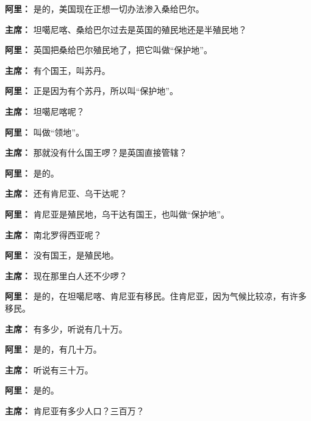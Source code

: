 \begin{duihua}
\item[\textbf{阿里：}] 是的，美国现在正想一切办法渗入桑给巴尔。

\item[\textbf{主席：}] 坦噶尼喀、桑给巴尔过去是英国的殖民地还是半殖民地？

\item[\textbf{阿里：}] 英国把桑给巴尔殖民地了，把它叫做“保护地”。

\item[\textbf{主席：}] 有个国王，叫苏丹。

\item[\textbf{阿里：}] 正是因为有个苏丹，所以叫“保护地”。

\item[\textbf{主席：}] 坦噶尼喀呢？

\item[\textbf{阿里：}] 叫做“领地”。

\item[\textbf{主席：}] 那就没有什么国王啰？是英国直接管辖？

\item[\textbf{阿里：}] 是的。

\item[\textbf{主席：}] 还有肯尼亚、乌干达呢？

\item[\textbf{阿里：}] 肯尼亚是殖民地，乌干达有国王，也叫做“保护地”。

\item[\textbf{主席：}] 南北罗得西亚呢？

\item[\textbf{阿里：}] 没有国王，是殖民地。

\item[\textbf{主席：}] 现在那里白人还不少啰？

\item[\textbf{阿里：}] 是的，在坦噶尼喀、肯尼亚有移民。住肯尼亚，因为气候比较凉，有许多移民。

\item[\textbf{主席：}] 有多少，听说有几十万。

\item[\textbf{阿里：}] 是的，有几十万。

\item[\textbf{主席：}] 听说有三十万。

\item[\textbf{阿里：}] 是的。

\item[\textbf{主席：}] 肯尼亚有多少人口？三百万？


\end{duihua}
